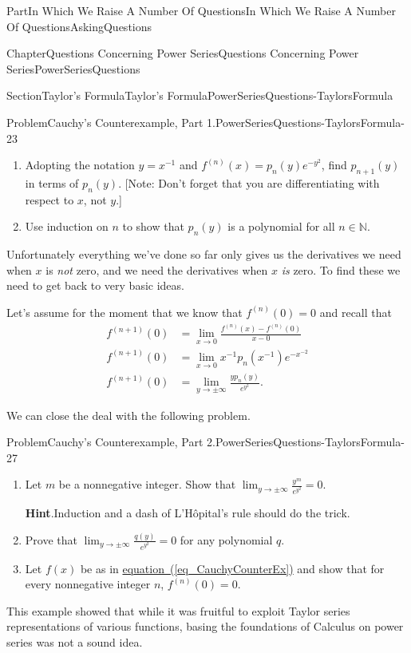 \documentclass[oneside,10pt,]{book}
\newcommand{\blocktitlefont}{\relax}
\newcommand{\xreffont}{\relax}
\numberwithin{equation}{part}
\def\limit#1#2#3{{\displaystyle\lim_{#1\rightarrow #2}#3}}
\newcommand{\NN}{\mathbb {N}}
\newcommand{\amp}{&}
\begin{document}
\begin{partptx}{Part}{In Which We Raise A Number Of Questions}{}{In Which We Raise A Number Of Questions}{}{}{AskingQuestions}
\begin{chapterptx}{Chapter}{Questions Concerning Power Series}{}{Questions Concerning Power Series}{}{}{PowerSeriesQuestions}
\begin{sectionptx}{Section}{Taylor's Formula}{}{Taylor's Formula}{}{}{PowerSeriesQuestions-TaylorsFormula}
\begin{problem}{Problem}{Cauchy's Counterexample, Part 1.}{PowerSeriesQuestions-TaylorsFormula-23}
\begin{enumerate}[font=\bfseries,label=(\alph*),ref=\alph*]%
\item{}Adopting the notation \(y=x^{-1}\) and \(f^{(n)}(x) =p_n(y)e^{-y^2}\), find \(p_{n+1}(y)\) in terms of \(p_{n}(y)\). [Note: Don't forget that you are differentiating with respect to \(x\), not \(y\).]%
\item{}Use induction on \(n\) to show that \(p_n(y)\) is a polynomial for all \(n\in\NN\).%
\end{enumerate}%
\end{problem}
Unfortunately everything we've done so far only gives us the derivatives we need when \(x\) is \emph{not} zero, and we need the derivatives when \(x\) \emph{is} zero. To find these we need to get back to very basic ideas.%
\par
Let's assume for the moment that we know that \(f^{(n)}(0)=0\) and recall that%
\begin{align*}
f^{(n+1)}(0) \amp = \limit{x}{0}{\frac{f^{(n)}(x)-f^{(n)}(0)}{x-0}}\\
f^{(n+1)}(0) \amp = \limit{x}{0}{x^{-1}p_n(x^{-1})e^{-x^{-2}}}\\
f^{(n+1)}(0) \amp = \limit{y}{\pm\infty}{\frac{yp_n(y)}{e^{y^2}}}\text{.}
\end{align*}
%
\par
We can close the deal with the following problem.%
\begin{problem}{Problem}{Cauchy's Counterexample, Part 2.}{PowerSeriesQuestions-TaylorsFormula-27}%
\begin{enumerate}[font=\bfseries,label=(\alph*),ref=\alph*]%
\item{}Let \(m\) be a nonnegative integer. Show that \(\limit{y}{\pm\infty}{\frac{y^m}{e^{y^2}}}=0\).%
\par\smallskip%
\noindent\textbf{\blocktitlefont Hint}.\hypertarget{PowerSeriesQuestions-TaylorsFormula-27-3-2}{}\quad{}Induction and a dash of L'Hôpital's rule should do the trick.%
\item{}Prove that \(\limit{y}{\pm\infty}{\frac{q(y)}{e^{y^2}}}=0\) for any polynomial \(q\).%
\item{}Let \(f(x)\) be as in \hyperref[eq_CauchyCounterEx]{equation~({\xreffont\ref{eq_CauchyCounterEx}})} and show that for every nonnegative integer \(n\), \(f^{(n)}(0)=0\).%
\end{enumerate}%
\end{problem}
This example showed that while it was fruitful to exploit Taylor series representations of various functions, basing the foundations of Calculus on power series was not a sound idea.%

\end{sectionptx}
\end{chapterptx}
\end{partptx}
\end{document}
